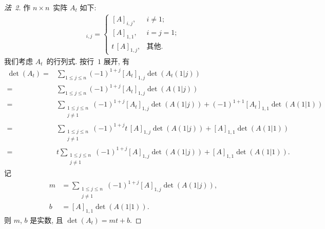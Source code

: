 \begin{proof}[法~2]
    作 \(n \times n\)~实阵 \(A_t\) 如下:
    \begin{align*}
        [A_t]_{i,j} =
        \begin{cases}
            [A]_{i,j},     & i \neq 1;  \\
            [A]_{1,1},     & i = j = 1; \\
            t\, [A]_{1,j}, & \text{其他}.
        \end{cases}
    \end{align*}
    我们考虑 \(A_t\)~的行列式.
    按行~\(1\) 展开, 有
    \begin{align*}
        \det {(A_t)}
        = {} &
        \sum_{1 \leq j \leq n}
        {(-1)^{1 + j} [A_t]_{1,j} \det {(A_t (1 | j))}}
        \\
        = {} &
        \sum_{1 \leq j \leq n}
        {(-1)^{1 + j} [A_t]_{1,j} \det {(A (1 | j))}}
        \\
        = {} &
        \sum_{\substack{1 \leq j \leq n \\j \neq 1}}
        {(-1)^{1 + j} [A_t]_{1,j} \det {(A (1 | j))}}
        +
        (-1)^{1 + 1} [A_t]_{1,1} \det {(A (1 | 1))}
        \\
        = {} &
        \sum_{\substack{1 \leq j \leq n \\j \neq 1}}
        {(-1)^{1 + j} t\, [A]_{1,j} \det {(A (1 | j))}}
        +
        [A]_{1,1} \det {(A (1 | 1))}
        \\
        = {} &
        t
        \sum_{\substack{1 \leq j \leq n \\j \neq 1}}
        {(-1)^{1 + j} [A]_{1,j} \det {(A (1 | j))}}
        +
        [A]_{1,1} \det {(A (1 | 1))}.
    \end{align*}
    记
    \begin{align*}
        m & =
        \sum_{\substack{1 \leq j \leq n \\j \neq 1}}
        {(-1)^{1 + j} [A]_{1,j} \det {(A (1 | j))}},
        \\
        b & =
        [A]_{1,1} \det {(A (1 | 1))}.
    \end{align*}
    则 \(m\), \(b\) 是实数, 且
    \(\det {(A_t)} = mt + b\).


\end{proof}

